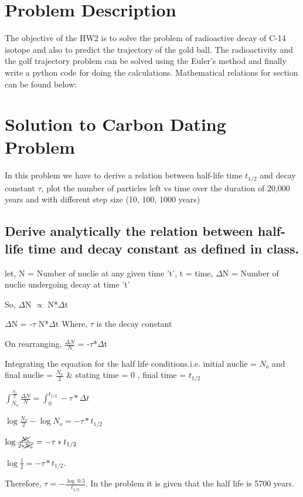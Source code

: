 \documentclass[11pt]{article}
\begin{document}
\begin{justify}
\section{Problem Description}
The objective of the HW2 is to solve the problem of radioactive decay of C-14 isotope and also to predict the trajectory of the gold ball. The radioactivity and the golf trajectory problem can be solved using the Euler's method and finally write a python code for doing the calculations.  Mathematical relations for section can be found below:

\section{Solution to Carbon Dating Problem}

In this problem we have to derive a relation between half-life time $t_{1/2}$ and decay constant $\tau$,  plot the number of particles left vs time over the duration of 20,000 years and with different step size (10, 100, 1000 years)

\subsection{Derive analytically the relation between half-life time  and decay constant as defined in class.}
let, N = Number of nuclie at any given time 't', t = time, $\Delta$N = Number of nuclie undergoing decay at time 't'

So, $\Delta$N $\propto $ N*$\Delta$t

$\Delta$N = -$\tau$ N*$\Delta$t {Where, $\tau$ is the decay constant}

On rearranging,
$\frac{\Delta N}{N}$ = -$\tau$*$\Delta$t

Integrating the equation for the half life conditions.i.e. initial nuclie = $N_{o}$ and final nuclie = $\frac{N_{o}}{2}$ \& stating time  = 0 , final time = $t_{1/2}$

$\int_{N_{o}}^{\frac{N_{o}}{2}}\frac{\Delta N}{N} = \int_{0}^{t_{1/2}}-\tau*\Delta t$

$\log\frac{N_{o}}{2} - \log N_{o} = -\tau*t_{1/2}$

$\log\frac{\cancel{N_{o}}}{2*\cancel{N_{o}}} = -\tau*t_{1/2}$

$\log\frac{1}{2} = -\tau*t_{1/2}$. 

Therefore, $\tau = -\frac{\log\ 0.5}{t_{1/2}}$.
In the problem it is given that the half life is 5700 years.


\end{justify}
\end{document}
